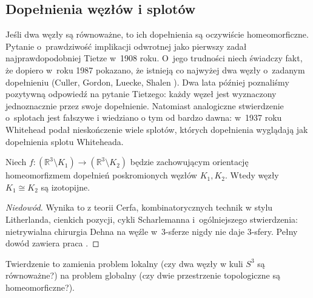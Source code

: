 \subsection{Dopełnienia węzłów i splotów}
Jeśli dwa węzły są równoważne, to ich dopełnienia są oczywiście homeomorficzne.
Pytanie o~prawdziwość implikacji odwrotnej jako pierwszy zadał najprawdopodobniej Tietze \cite{tietze1908} w~1908 roku.
%
O~jego trudności niech świadczy fakt, że dopiero w~roku 1987 pokazano, że istnieją co najwyżej dwa węzły o~zadanym dopełnieniu (Culler, Gordon, Luecke, Shalen \cite{culler1987}).
%
%
%
%
Dwa lata później poznaliśmy pozytywną odpowiedź na pytanie Tietzego: każdy węzeł jest wyznaczony jednoznacznie przez swoje dopełnienie.
Natomiast analogiczne stwierdzenie o~splotach jest fałszywe i wiedziano o tym od bardzo dawna: w~1937 roku Whitehead \cite{whitehead1937} podał nieskończenie wiele splotów, których dopełnienia wyglądają jak dopełnienia splotu Whiteheada.

\begin{theorem}
%
%
%
    Niech $f \colon (\mathbb R^3 \setminus K_1) \to (\mathbb R^3 \setminus K_2)$ będzie zachowującym orientację homeomorfizmem dopełnień poskromionych węzłów $K_1, K_2$.
    Wtedy węzły $K_1 \cong K_2$ są izotopijne.
\end{theorem}

\begin{proof}[Niedowód]
    Wynika to z teorii Cerfa, kombinatorycznych technik w stylu Litherlanda, cienkich pozycji, cykli Scharlemanna i~ogólniejszego stwierdzenia: nietrywialna chirurgia Dehna na węźle w~3-sferze nigdy nie daje 3-sfery.
%
%
%
    Pełny dowód zawiera praca \cite{gordon1989}.
\end{proof}

Twierdzenie to zamienia problem lokalny (czy dwa węzły w kuli $S^3$ są równoważne?) na problem globalny (czy dwie przestrzenie topologiczne są homeomorficzne?).
%